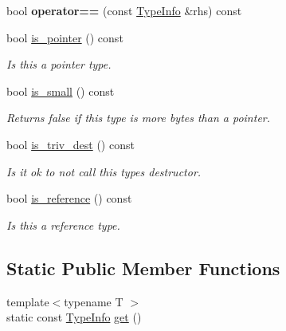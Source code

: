 \begin{DoxyCompactItemize}
\item 
\mbox{\label{structnta_1_1utils_1_1TypeInfo_a4ebffb29c163df58791703c0874b8007}} 
bool {\bfseries operator==} (const \hyperlink{structnta_1_1utils_1_1TypeInfo}{Type\+Info} \&rhs) const
\item 
\mbox{\label{structnta_1_1utils_1_1TypeInfo_a549c5a27697cb49319d06daa4b54d5cd}} 
bool \hyperlink{structnta_1_1utils_1_1TypeInfo_a549c5a27697cb49319d06daa4b54d5cd}{is\+\_\+pointer} () const
\begin{DoxyCompactList}\small\item\em Is this a pointer type. \end{DoxyCompactList}\item 
\mbox{\label{structnta_1_1utils_1_1TypeInfo_ae9a785285b84f390fd858dd767d230a5}} 
bool \hyperlink{structnta_1_1utils_1_1TypeInfo_ae9a785285b84f390fd858dd767d230a5}{is\+\_\+small} () const
\begin{DoxyCompactList}\small\item\em Returns false if this type is more bytes than a pointer. \end{DoxyCompactList}\item 
\mbox{\label{structnta_1_1utils_1_1TypeInfo_aee490e9df5ce68e308277ab195aabf6d}} 
bool \hyperlink{structnta_1_1utils_1_1TypeInfo_aee490e9df5ce68e308277ab195aabf6d}{is\+\_\+triv\+\_\+dest} () const
\begin{DoxyCompactList}\small\item\em Is it ok to not call this type\textquotesingle{}s destructor. \end{DoxyCompactList}\item 
\mbox{\label{structnta_1_1utils_1_1TypeInfo_a1878355b1ae1836c9b20cb7a0d6fb25a}} 
bool \hyperlink{structnta_1_1utils_1_1TypeInfo_a1878355b1ae1836c9b20cb7a0d6fb25a}{is\+\_\+reference} () const
\begin{DoxyCompactList}\small\item\em Is this a reference type. \end{DoxyCompactList}\end{DoxyCompactItemize}
\subsection*{Static Public Member Functions}
\begin{DoxyCompactItemize}
\item 
{\footnotesize template$<$typename T $>$ }\\static const \hyperlink{structnta_1_1utils_1_1TypeInfo}{Type\+Info} \hyperlink{structnta_1_1utils_1_1TypeInfo_ae478709ae382b3f85cfa2e9d529681a7}{get} ()
\end{DoxyCompactItemize}
